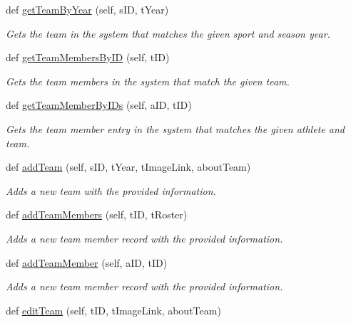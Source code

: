 \begin{DoxyCompactItemize}
def \hyperlink{classhandler_1_1team_1_1_team_handler_a4ee11f08a2e69e4a250527c9fea26190}{get\+Team\+By\+Year} (self, s\+ID, t\+Year)
\begin{DoxyCompactList}\small\item\em Gets the team in the system that matches the given sport and season year. \end{DoxyCompactList}\item 
def \hyperlink{classhandler_1_1team_1_1_team_handler_a01c7ec029ad084fb936ef9c90ef3a1c0}{get\+Team\+Members\+By\+ID} (self, t\+ID)
\begin{DoxyCompactList}\small\item\em Gets the team members in the system that match the given team. \end{DoxyCompactList}\item 
def \hyperlink{classhandler_1_1team_1_1_team_handler_a1a00f6d69828c15ce2da7b4215c868cf}{get\+Team\+Member\+By\+I\+Ds} (self, a\+ID, t\+ID)
\begin{DoxyCompactList}\small\item\em Gets the team member entry in the system that matches the given athlete and team. \end{DoxyCompactList}\item 
def \hyperlink{classhandler_1_1team_1_1_team_handler_aed8995a60a6cdee0c5b59f2cab85e3af}{add\+Team} (self, s\+ID, t\+Year, t\+Image\+Link, about\+Team)
\begin{DoxyCompactList}\small\item\em Adds a new team with the provided information. \end{DoxyCompactList}\item 
def \hyperlink{classhandler_1_1team_1_1_team_handler_ae689082bd35b83e30cac03ad19d79ba5}{add\+Team\+Members} (self, t\+ID, t\+Roster)
\begin{DoxyCompactList}\small\item\em Adds a new team member record with the provided information. \end{DoxyCompactList}\item 
def \hyperlink{classhandler_1_1team_1_1_team_handler_a1f3809c59410d793a9b5db0de1a3b6b8}{add\+Team\+Member} (self, a\+ID, t\+ID)
\begin{DoxyCompactList}\small\item\em Adds a new team member record with the provided information. \end{DoxyCompactList}\item 
def \hyperlink{classhandler_1_1team_1_1_team_handler_a465fbb07ab9d8a5bcd3f53686da4e44b}{edit\+Team} (self, t\+ID, t\+Image\+Link, about\+Team)

\end{DoxyCompactItemize}

